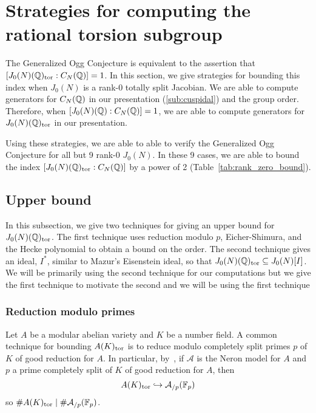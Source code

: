 \section{Strategies for computing the rational torsion subgroup}
\label{sec:strategies_for_rational_torsion}

The Generalized Ogg Conjecture is equivalent to the assertion that
$[J_0(N)(\mathbb{Q})_{\mathrm{tor}}:C_N(\mathbb{Q})]=1$. In this section, we give strategies for
bounding this index when $J_0(N)$ is a rank-0 totally split Jacobian. We are
able to compute generators for $C_N(\mathbb{Q})$ in our presentation
(\ref{sub:cuspidal}) and the group order. Therefore, when
$[J_0(N)(\mathbb{Q}):C_N(\mathbb{Q})]=1$, we are able to compute generators for
$J_0(N)(\mathbb{Q})_{\mathrm{tor}}$ in our presentation.

Using these strategies, we are able to able to verify the Generalized Ogg
Conjecture for all but 9 rank-0 $J_0(N)$. In these 9 cases, we are
able to bound the index $[J_0(N)(\mathbb{Q})_{\mathrm{tor}}:C_N(\mathbb{Q})]$ by a power of 2
(Table~\ref{tab:rank_zero_bound}).

\subsection{Upper bound}%
\label{sub:upper_bound}

In this subsection, we give two techniques for giving an upper bound for
$J_0(N)(\mathbb{Q})_{\mathrm{tor}}$. The first technique uses reduction modulo $p$,
Eicher-Shimura, and the Hecke polynomial to obtain a bound on the order. The
second technique gives an ideal, $I^*$, similar to Mazur's Eisenstein ideal, so
that $J_0(N)(\mathbb{Q})_{\mathrm{tor}}\subseteq J_0(N)[I]$. We will be primarily using the
second technique for our computations but we give the first technique to
motivate the second and we will be using the first technique

\subsubsection{Reduction modulo primes}%
\label{ssub:reduction_modulo_primes}
Let $A$ be a modular abelian variety and $K$ be a number field. A common
technique for bounding $A(K)_{\mathrm{tor}}$ is to reduce modulo completely split primes
$p$ of $K$ of good reduction for $A$. In particular,
by~\cite[Appendix]{katz:torsion}, if $\mathcal{A}$ is the Neron model for $A$
and $p$ a prime completely split of $K$ of good reduction for $A$, then
\[
    A(K)_{\mathrm{tor}} \hookrightarrow \mathcal{A}_{/p}(\mathbb{F}_p)
\]
so $\# A(K)_{\mathrm{tor}} \mid \#\mathcal{A}_{/p}(\mathbb{F}_p)$.

